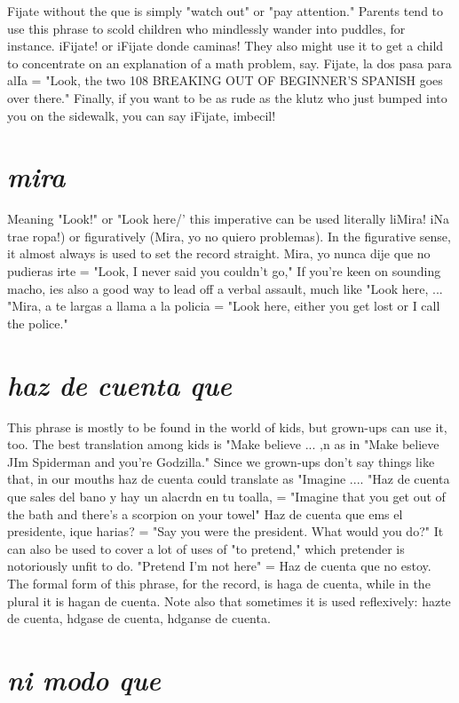 Fijate without the que is simply "watch out" or "pay attention." Parents tend to use this phrase to scold children who mindlessly
wander into puddles, for instance. iFijate! or iFijate donde caminas!
They also might use it to get a child to concentrate on an explanation
of a math problem, say. Fijate, la dos pasa para alIa = "Look, the two
108 BREAKING OUT OF BEGINNER'S SPANISH
goes over there." Finally, if you want to be as rude as the klutz who
just bumped into you on the sidewalk, you can say iFijate, imbecil!

\section{\emph{mira}}

Meaning "Look!" or "Look here/' this imperative can be used
literally liMira! iNa trae ropa!) or figuratively (Mira, yo no quiero
problemas). In the figurative sense, it almost always is used to set the
record straight. Mira, yo nunca dije que no pudieras irte = "Look,
I never said you couldn't go," If you're keen on sounding macho, ies
also a good way to lead off a verbal assault, much like "Look here, ...
"Mira, a te largas a llama a la policia = "Look here, either you get
lost or I call the police."

\section{\emph{haz de cuenta que}}

This phrase is mostly to be found in the world of kids, but
grown-ups can use it, too. The best translation among kids is "Make
believe ... ,n as in "Make believe JIm Spiderman and you're Godzilla."
Since we grown-ups don't say things like that, in our mouths haz de
cuenta could translate as "Imagine .... "Haz de cuenta que sales del
bano y hay un alacrdn en tu toalla, = "Imagine that you get out of the
bath and there's a scorpion on your towel" Haz de cuenta que ems el
presidente, ique harias? = "Say you were the president. What would
you do?" It can also be used to cover a lot of uses of "to pretend,"
which pretender is notoriously unfit to do. "Pretend I'm not here" =
Haz de cuenta que no estoy. The formal form of this phrase, for the
record, is haga de cuenta, while in the plural it is hagan de cuenta.
Note also that sometimes it is used reflexively: hazte de cuenta, hdgase de cuenta, hdganse de cuenta.

\section{\emph{ni modo que}}

